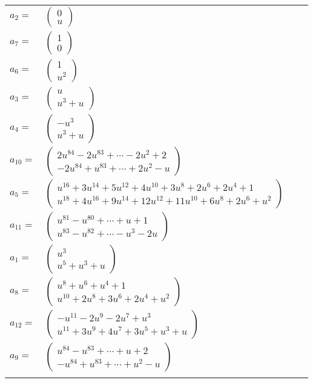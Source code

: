 \documentclass[1p]{elsarticle_modified}
\theoremstyle{definition}
\begin{document}
\begin{tabular}{m{7pt} m{180pt} m{7pt} m{180pt} }
\flushright $a_{2}=$&$\begin{pmatrix}0\\u\end{pmatrix}$ \\
\flushright $a_{7}=$&$\begin{pmatrix}1\\0\end{pmatrix}$ \\
\flushright $a_{6}=$&$\begin{pmatrix}1\\u^2\end{pmatrix}$ \\
\flushright $a_{3}=$&$\begin{pmatrix}u\\u^3+u\end{pmatrix}$ \\
\flushright $a_{4}=$&$\begin{pmatrix}- u^3\\u^3+u\end{pmatrix}$ \\
\flushright $a_{10}=$&$\begin{pmatrix}2 u^{84}-2 u^{83}+\cdots-2 u^2+2\\-2 u^{84}+u^{83}+\cdots+2 u^2- u\end{pmatrix}$ \\
\flushright $a_{5}=$&$\begin{pmatrix}u^{16}+3 u^{14}+5 u^{12}+4 u^{10}+3 u^8+2 u^6+2 u^4+1\\u^{18}+4 u^{16}+9 u^{14}+12 u^{12}+11 u^{10}+6 u^8+2 u^6+u^2\end{pmatrix}$ \\
\flushright $a_{11}=$&$\begin{pmatrix}u^{81}- u^{80}+\cdots+u+1\\u^{83}- u^{82}+\cdots- u^3-2 u\end{pmatrix}$ \\
\flushright $a_{1}=$&$\begin{pmatrix}u^3\\u^5+u^3+u\end{pmatrix}$ \\
\flushright $a_{8}=$&$\begin{pmatrix}u^8+u^6+u^4+1\\u^{10}+2 u^8+3 u^6+2 u^4+u^2\end{pmatrix}$ \\
\flushright $a_{12}=$&$\begin{pmatrix}- u^{11}-2 u^9-2 u^7+u^3\\u^{11}+3 u^9+4 u^7+3 u^5+u^3+u\end{pmatrix}$ \\
\flushright $a_{9}=$&$\begin{pmatrix}u^{84}- u^{83}+\cdots+u+2\\- u^{84}+u^{83}+\cdots+u^2- u\end{pmatrix}$\\&\end{tabular}
\end{document}
